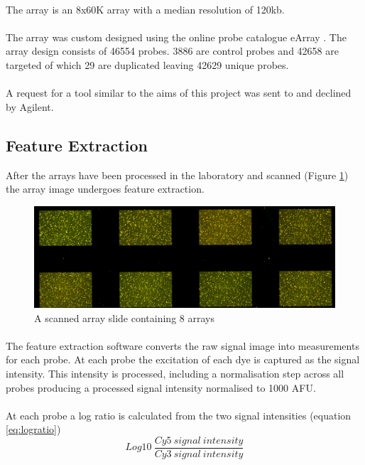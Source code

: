 \paragraph*{}
The array is an 8x60K array with a median resolution of 120kb. 
\paragraph*{}
The array was custom designed using the online probe catalogue eArray \cite{agilenttechnologies_earray}. The array design consists of 46554 probes. 3886 are control probes and 42658 are targeted of which 29 are duplicated leaving 42629 unique probes.
\paragraph*{}
A request for a tool similar to the aims of this project was sent to and declined by Agilent.

\subsection{Feature Extraction}
After the arrays have been processed in the laboratory and scanned (Figure \ref{fig:microarrayslide}) the array image undergoes feature extraction.
\begin{figure}
\centering
\includegraphics[width=\linewidth]{./Figures/microarrayslide}
\caption[A scanned 8 x 60k array]{A scanned array slide containing 8 arrays}
\label{fig:microarrayslide}
\end{figure}

\paragraph*{}
The feature extraction software converts the raw signal image into measurements for each probe. At each probe the excitation of each dye is captured as the signal intensity. This intensity is processed, including a normalisation step across all probes producing a processed signal intensity normalised to 1000 \ac{AFU}.
\paragraph*{}
At each probe a log ratio is calculated from the two signal intensities (equation \ref{eq:logratio})
\begin{equation}\label{eq:logratio}
Log10\ \frac{Cy5\ signal\ intensity}{Cy3\ signal\ intensity}
\end{equation} 

